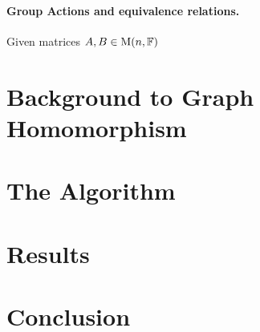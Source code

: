\documentclass[a4paper,12pt]{article}
\begin{document}

\paragraph{Group Actions and equivalence relations.} Given matrices $A,B\in\operatorname{\mathrm{M}}(n,\mathbb{F})$

\section{Background to Graph Homomorphism}\label{sec:background}


\section{The Algorithm}\label{sec:algorithm}

\section{Results}\label{sec:results}

\section{Conclusion}\label{sec:conclusion}
\end{document}
